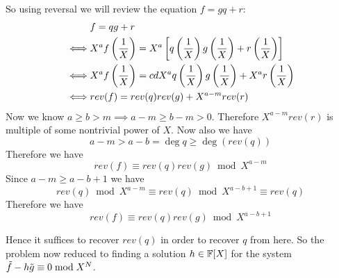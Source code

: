 
So using reversal we will review the equation $f=gq+r$:
\begin{align*}
	& f=qg+r\\
	\iff & X^af\left(\frac1X\right)=X^a\left[q\left(\frac1X\right)g\left(\frac1X\right)+r\left(\frac1X\right)\right]\\
	\iff & X^af\left(\frac1X\right)=cdX^aq\left(\frac1X\right)g\left(\frac1X\right)+X^ar\left(\frac1X\right)\\
	\iff & rev(f)=rev(q)rev(g)+X^{a-m}rev(r) 
\end{align*}
Now we know $a\geq b>m\implies a-m\geq b-m>0$. Therefore $X^{a-m}rev(r)$ is multiple of some nontrivial power of $X$. Now also we have $$a-m>a-b=\deg q\geq \deg(rev(q))$$ Therefore we have $$rev(f)\equiv rev(q)rev(g)\bmod {X^{a-m}}$$Since $a-m\geq a-b+1$ we have $$rev(q)\bmod {X^{a-m}}\equiv rev(q)\bmod {X^{a-b+1}}\equiv rev(q)$$Therefore we have $$rev(f)\equiv rev(q)rev(g)\bmod {X^{a-b+1}}$$

Hence it suffices to recover $rev(q)$ in order to recover $q$ from here. So the problem now reduced to finding a solution $h\in\mathbb{F}[X]$ for the system $\tilde{f}-h\tilde{g}\equiv 0\bmod{X^N}$.

